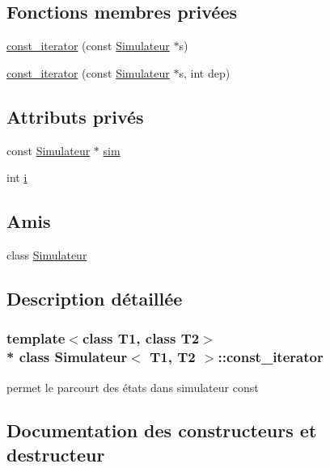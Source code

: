 \subsection*{Fonctions membres privées}
\begin{DoxyCompactItemize}
\item 
\hyperlink{class_simulateur_1_1const__iterator_ac86b41f09bf9b8975b7f4d91ee5f0d52}{const\+\_\+iterator} (const \hyperlink{class_simulateur}{Simulateur} $\ast$s)
\item 
\hyperlink{class_simulateur_1_1const__iterator_a8baadf24b767532a6e5d3d4ed59e0eab}{const\+\_\+iterator} (const \hyperlink{class_simulateur}{Simulateur} $\ast$s, int dep)
\end{DoxyCompactItemize}
\subsection*{Attributs privés}
\begin{DoxyCompactItemize}
\item 
const \hyperlink{class_simulateur}{Simulateur} $\ast$ \hyperlink{class_simulateur_1_1const__iterator_af879bec3ae8b71f1c81826e0c1b24077}{sim}
\item 
int \hyperlink{class_simulateur_1_1const__iterator_aa4b2261e7087b7c68391c893aa531973}{i}
\end{DoxyCompactItemize}
\subsection*{Amis}
\begin{DoxyCompactItemize}
\item 
class \hyperlink{class_simulateur_1_1const__iterator_ae6c3966e699bf920c86e0bd006bd8183}{Simulateur}
\end{DoxyCompactItemize}


\subsection{Description détaillée}
\subsubsection*{template$<$class T1, class T2$>$\\*
class Simulateur$<$ T1, T2 $>$\+::const\+\_\+iterator}

permet le parcourt des états dans simulateur const 

\subsection{Documentation des constructeurs et destructeur}
